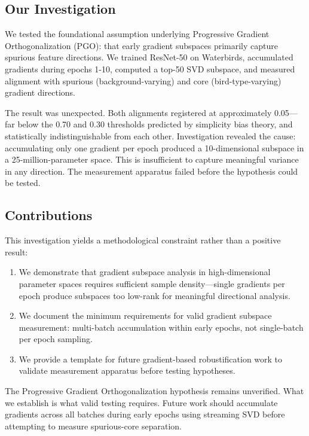 \subsection{Our Investigation}

We tested the foundational assumption underlying Progressive Gradient Orthogonalization (PGO): that early gradient subspaces primarily capture spurious feature directions. We trained ResNet-50 on Waterbirds, accumulated gradients during epochs 1-10, computed a top-50 SVD subspace, and measured alignment with spurious (background-varying) and core (bird-type-varying) gradient directions.

The result was unexpected. Both alignments registered at approximately 0.05---far below the 0.70 and 0.30 thresholds predicted by simplicity bias theory, and statistically indistinguishable from each other. Investigation revealed the cause: accumulating only one gradient per epoch produced a 10-dimensional subspace in a 25-million-parameter space. This is insufficient to capture meaningful variance in any direction. The measurement apparatus failed before the hypothesis could be tested.

\subsection{Contributions}

This investigation yields a methodological constraint rather than a positive result:

\begin{enumerate}
    \item We demonstrate that gradient subspace analysis in high-dimensional parameter spaces requires sufficient sample density---single gradients per epoch produce subspaces too low-rank for meaningful directional analysis.
    \item We document the minimum requirements for valid gradient subspace measurement: multi-batch accumulation within early epochs, not single-batch per epoch sampling.
    \item We provide a template for future gradient-based robustification work to validate measurement apparatus before testing hypotheses.
\end{enumerate}

The Progressive Gradient Orthogonalization hypothesis remains unverified. What we establish is what valid testing requires. Future work should accumulate gradients across all batches during early epochs using streaming SVD before attempting to measure spurious-core separation.
